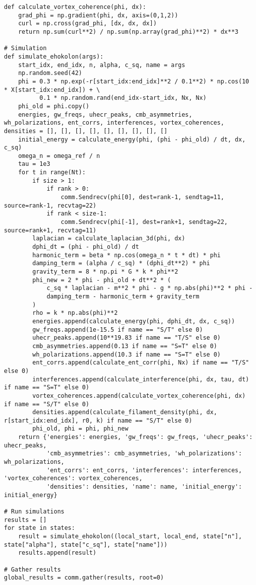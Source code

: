 \documentclass[11pt]{article}
\begin{document}
\begin{lstlisting}
def calculate_vortex_coherence(phi, dx):
    grad_phi = np.gradient(phi, dx, axis=(0,1,2))
    curl = np.cross(grad_phi, [dx, dx, dx])
    return np.sum(curl**2) / np.sum(np.array(grad_phi)**2) * dx**3

# Simulation
def simulate_ehokolon(args):
    start_idx, end_idx, n, alpha, c_sq, name = args
    np.random.seed(42)
    phi = 0.3 * np.exp(-r[start_idx:end_idx]**2 / 0.1**2) * np.cos(10 * X[start_idx:end_idx]) + \
          0.1 * np.random.rand(end_idx-start_idx, Nx, Nx)
    phi_old = phi.copy()
    energies, gw_freqs, uhecr_peaks, cmb_asymmetries, wh_polarizations, ent_corrs, interferences, vortex_coherences, densities = [], [], [], [], [], [], [], [], []
    initial_energy = calculate_energy(phi, (phi - phi_old) / dt, dx, c_sq)
    omega_n = omega_ref / n
    tau = 1e3
    for t in range(Nt):
        if size > 1:
            if rank > 0:
                comm.Sendrecv(phi[0], dest=rank-1, sendtag=11, source=rank-1, recvtag=22)
            if rank < size-1:
                comm.Sendrecv(phi[-1], dest=rank+1, sendtag=22, source=rank+1, recvtag=11)
        laplacian = calculate_laplacian_3d(phi, dx)
        dphi_dt = (phi - phi_old) / dt
        harmonic_term = beta * np.cos(omega_n * t * dt) * phi
        damping_term = (alpha / c_sq) * (dphi_dt**2) * phi
        gravity_term = 8 * np.pi * G * k * phi**2
        phi_new = 2 * phi - phi_old + dt**2 * (
            c_sq * laplacian - m**2 * phi - g * np.abs(phi)**2 * phi - 
            damping_term - harmonic_term + gravity_term
        )
        rho = k * np.abs(phi)**2
        energies.append(calculate_energy(phi, dphi_dt, dx, c_sq))
        gw_freqs.append(1e-15.5 if name == "S/T" else 0)
        uhecr_peaks.append(10**19.83 if name == "T/S" else 0)
        cmb_asymmetries.append(0.13 if name == "S=T" else 0)
        wh_polarizations.append(10.3 if name == "S=T" else 0)
        ent_corrs.append(calculate_ent_corr(phi, Nx) if name == "T/S" else 0)
        interferences.append(calculate_interference(phi, dx, tau, dt) if name == "S=T" else 0)
        vortex_coherences.append(calculate_vortex_coherence(phi, dx) if name == "S/T" else 0)
        densities.append(calculate_filament_density(phi, dx, r[start_idx:end_idx], r0, k) if name == "S/T" else 0)
        phi_old, phi = phi, phi_new
    return {'energies': energies, 'gw_freqs': gw_freqs, 'uhecr_peaks': uhecr_peaks, 
            'cmb_asymmetries': cmb_asymmetries, 'wh_polarizations': wh_polarizations, 
            'ent_corrs': ent_corrs, 'interferences': interferences, 'vortex_coherences': vortex_coherences, 
            'densities': densities, 'name': name, 'initial_energy': initial_energy}

# Run simulations
results = []
for state in states:
    result = simulate_ehokolon((local_start, local_end, state["n"], state["alpha"], state["c_sq"], state["name"]))
    results.append(result)

# Gather results
global_results = comm.gather(results, root=0)
\end{lstlisting}
\end{document}
